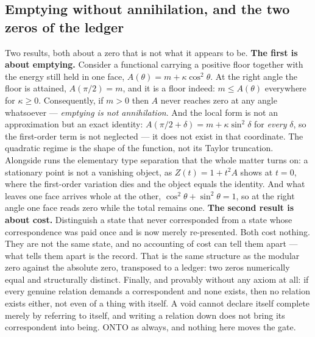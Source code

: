 \documentclass[11pt]{article}
\theoremstyle{definition}\newtheorem{deriv}{Derivation}
\begin{document}
\subsection*{Emptying without annihilation, and the two zeros of the ledger}Two results, both about a zero that is not what it appears to be. \textbf{The first is about emptying.} Consider a functional carrying a positive floor together with the energy still held in one face, $A(\theta) = m + \kappa\cos^2\theta$. At the right angle the floor is attained, $A(\pi/2)=m$, and it is a floor indeed: $m \leq A(\theta)$ everywhere for $\kappa\geq 0$. Consequently, if $m>0$ then $A$ never reaches zero at any angle whatsoever --- \emph{emptying is not annihilation}. And the local form is not an approximation but an exact identity: $A(\pi/2+\delta) = m + \kappa\sin^2\delta$ for \emph{every} $\delta$, so the first-order term is not neglected --- it does not exist in that coordinate. The quadratic regime is the shape of the function, not its Taylor truncation. Alongside runs the elementary type separation that the whole matter turns on: a stationary point is not a vanishing object, as $Z(t)=1+t^2A$ shows at $t=0$, where the first-order variation dies and the object equals the identity. And what leaves one face arrives whole at the other, $\cos^2\theta+\sin^2\theta=1$, so at the right angle one face reads zero while the total remains one. \textbf{The second result is about cost.} Distinguish a state that never corresponded from a state whose correspondence was paid once and is now merely re-presented. Both cost nothing. They are not the same state, and no accounting of cost can tell them apart --- what tells them apart is the record. That is the same structure as the modular zero against the absolute zero, transposed to a ledger: two zeros numerically equal and structurally distinct. Finally, and provably without any axiom at all: if every genuine relation demands a correspondent and none exists, then no relation exists either, not even of a thing with itself. A void cannot declare itself complete merely by referring to itself, and writing a relation down does not bring its correspondent into being. \textsf{ONTO} as always, and nothing here moves the gate.
\end{document}
